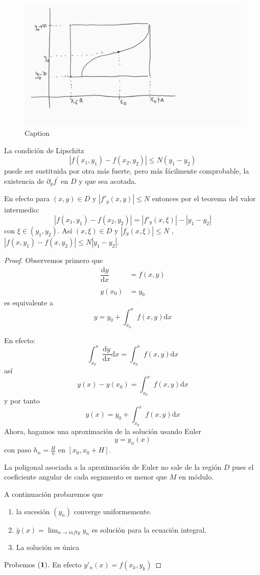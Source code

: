 \begin{figure}[H]
    \centering
    \includegraphics[scale=0.25]{graficas1.png}
    \caption{Caption}
    \label{fig:my_label}
\end{figure}


La condici\'on de Lipschitz 
$$
|f(x_1,y_1)-f(x_2,y_2)|\leq N(y_1-y_2)
$$
puede ser sustituida por otra m\'as fuerte, pero m\'as f\'acilmente comprobable, la existencia de $\partial_{y} f^{'}$ en $D$ y que sea acotada.

En efecto para $(x,y)\in D$ y $|f'_y(x,y)|\leq N$ entonces por el teorema del valor intermedio:
$$
|f(x_1,y_1)-f(x_2,y_2)|=|f'_y(x,\xi)|-|y_1-y_2| 
$$
con $\xi\in (y_1,y_2)$. As\'i $(x,\xi)\in D$ y $|f_y(x,\xi)|\leq N$ , $|f(x,y_1)-f(x,y_2)|\leq N|y_1-y_2|$.

\begin{proof}
Observemos primero que 
$$
\left.\begin{array}{cc}
    \dfrac{\mathrm{d}y}{\mathrm{d}x}&=f(x,y)  \\
    &\\
    y(x_0) &=y_0 
\end{array}\right.
$$
es equivalente a
$$
y=y_0+\int_{x_0}^xf(x,y)\mathrm{d}x
$$

En efecto:
$$
\int_{x_0}^x\frac{\mathrm{d}y}{\mathrm{d}x}\mathrm{d}x=\int_{x_0}^xf(x,y)\mathrm{d}x
$$
así
$$
y(x)-y(x_0)=\int_{x_0}^xf(x,y)\mathrm{d}x
$$
y por tanto
$$
y(x)=y_0+\int_{x_0}^xf(x,y)\mathrm{d}x
$$
Ahora, hagamos una aproximaci\'on de  la soluci\'on usando Euler
$$
y=y_n(x)
$$
con paso $h_n=\frac{H}{n}$ en $[x_0,x_0+H]$.

La poligonal asociada a la aproximaci\'on de Euler no sale de la regi\'on $D$ pues el coeficiente angular de cada segnmento es menor  que $M$ en m\'odulo.

A continuaci\'on probaremos que
\begin{enumerate}
\item la sucesi\'on  $(y_n)$ converge uniformemente.
\item $\bar{y}(x)=\lim_{n\rightarrow infty}y_n$ es soluci\'on para la ecuaci\'on integral.
  \item La soluci\'on es \'unica
\end{enumerate} 

Probemos $\bf{(1)}$. En efecto $y'_n(x)=f(x_k,y_k)$ 
\end{proof}
 